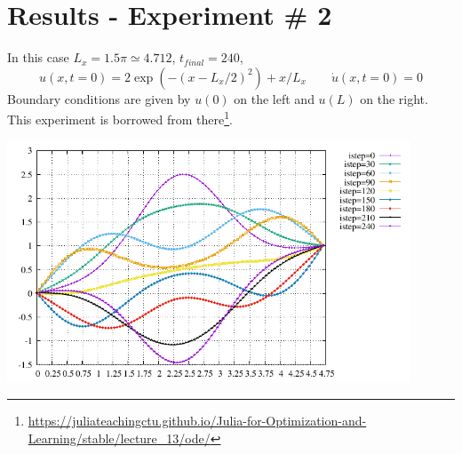 \section*{Results - Experiment \# 2}

In this case $L_x=1.5\pi\simeq 4.712$, $t_{final}=240$, 
\[
u(x,t=0)=2 \exp\left(-(x-L_x/2)^2 \right)+x/L_x
\qquad
\dot{u}(x,t=0)=0 
\]
Boundary conditions are given by $u(0)$ on the left and $u(L)$ on the right.
This experiment is borrowed from there\footnote{\url{https://juliateachingctu.github.io/Julia-for-Optimization-and-Learning/stable/lecture_13/ode/}}.

\begin{center}
\includegraphics[width=12cm]{python_codes/fieldstone_164/results2/u.pdf}
\end{center}




